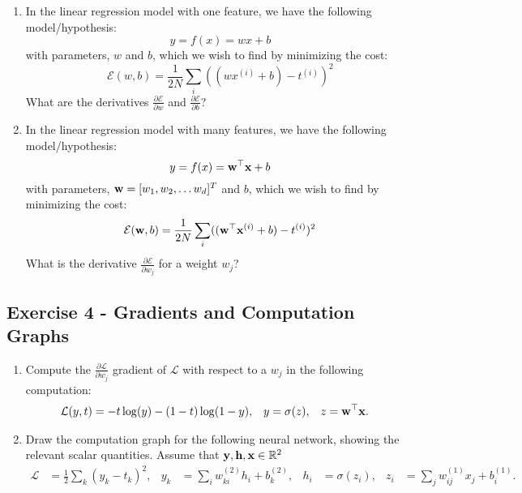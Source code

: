 \documentclass[
  letterpaper,
  DIV=11,
  numbers=noendperiod]{scrartcl}
\begin{document}
\begin{enumerate}
\def\labelenumi{(\alph{enumi})}
\item
  In the linear regression model with one feature, we have the following
  model/hypothesis: \[y = f(x) = w x + b\] \hspace{0pt}with parameters,
  \(w\) and \(b\), which we wish to find by minimizing the cost:
  \[\mathcal{E}(w, b) = \frac{1}{2N}\sum_i ((w x^{(i)} + b) - t^{(i)})^2\]
  What are the derivatives \(\frac{\partial \mathcal{E}}{\partial w}\)
  and \(\frac{\partial \mathcal{E}}{\partial b}\)?
\item
  In the linear regression model with many features, we have the
  following model/hypothesis: \[y = f(x) = {\bf w}^\top {\bf x}+ b\]
  with parameters, \({\bf w} = [w_1, w_2, \dots w_d]^T\) and \(b\),
  which we wish to find by minimizing the cost:
  \[\mathcal{E}({\bf w}, b) = \frac{1}{2N}\sum_i ((\mathbf{w}^\top \mathbf{x}^{(i)}+b) - t^{(i)})^2\]
  What is the derivative \(\frac{\partial \mathcal{E}}{\partial w_j}\)
  for a weight \(w_j\)?
\end{enumerate}

\subsection{Exercise 4 - Gradients and Computation
Graphs}\label{exercise-4---gradients-and-computation-graphs}

\begin{enumerate}
\def\labelenumi{(\alph{enumi})}
\item
  Compute the \(\frac{\partial \mathcal{L}}{\partial w_j}\) gradient of
  \(\mathcal{L}\) with respect to a \(w_j\) in the following
  computation: \begin{align*} 
    \mathcal{L}(y, t) &= - t \log(y) - (1-t) \log(1-y) ,
  & y &= \sigma(z) ,
  &  z &= {\bf w}^\top {\bf x} .
    \end{align*}
\item
  Draw the computation graph for the following neural network, showing
  the relevant scalar quantities. Assume that
  \(\mathbf{y}, \mathbf{h}, \mathbf{x} \in \mathbb{R}^2\) \begin{align*}
    \mathcal{L} &= \frac{1}{2}\sum_k (y_k - t_k)^2 , 
  & y_k &= \sum_i w_{ki}^{(2)} h_i + b_k^{(2)} , 
  & h_i &= \sigma(z_i) ,
  & z_i &= \sum_j w_{ij}^{(1)} x_j + b_i^{(1)} .
    \end{align*}
\end{enumerate}
\end{document}
